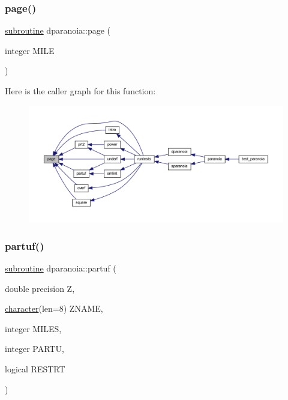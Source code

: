 \subsubsection{\texorpdfstring{page()}{page()}}
{\footnotesize\ttfamily \hyperlink{M__stopwatch_83_8txt_acfbcff50169d691ff02d4a123ed70482}{subroutine} dparanoia\+::page (\begin{DoxyParamCaption}\item[{integer}]{M\+I\+LE }\end{DoxyParamCaption})}

Here is the caller graph for this function\+:
\nopagebreak
\begin{figure}[H]
\begin{center}
\leavevmode
\includegraphics[width=350pt]{dparanoia_8f90_a6586ce42b5da5bd64211632cefda8a76_icgraph}
\end{center}
\end{figure}
\mbox{\label{dparanoia_8f90_abc9aeab695bb0d80eadb75bba822fee2}} 
\subsubsection{\texorpdfstring{partuf()}{partuf()}}
{\footnotesize\ttfamily \hyperlink{M__stopwatch_83_8txt_acfbcff50169d691ff02d4a123ed70482}{subroutine} dparanoia\+::partuf (\begin{DoxyParamCaption}\item[{double precision}]{Z,  }\item[{\hyperlink{option__stopwatch_83_8txt_abd4b21fbbd175834027b5224bfe97e66}{character}(len=8)}]{Z\+N\+A\+ME,  }\item[{integer}]{M\+I\+L\+ES,  }\item[{integer}]{P\+A\+R\+TU,  }\item[{logical}]{R\+E\+S\+T\+RT }\end{DoxyParamCaption})}



